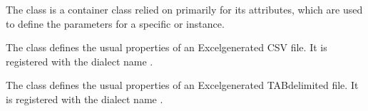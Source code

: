 \documentclass[letterpaper,10pt,english]{sphinxmanual}
\begin{document}
\begin{fulllineitems}
\label{\detokenize{csv:csv.Dialect}}
The {\hyperref[\detokenize{csv:csv.Dialect}]{}} class is a container class relied on primarily for its
attributes, which are used to define the parameters for a specific
{\hyperref[\detokenize{csv:csv.reader}]{}} or {\hyperref[\detokenize{csv:csv.writer}]{}} instance.

\end{fulllineitems}


\vspace{5px}

\begin{fulllineitems}
\label{\detokenize{csv:csv.excel}}
The {\hyperref[\detokenize{csv:csv.excel}]{}} class defines the usual properties of an Excel\sphinxhyphen{}generated CSV
file.  It is registered with the dialect name .

\end{fulllineitems}


\vspace{5px}

\begin{fulllineitems}
\label{\detokenize{csv:csv.excel_tab}}
The {\hyperref[\detokenize{csv:csv.excel_tab}]{}} class defines the usual properties of an Excel\sphinxhyphen{}generated
TAB\sphinxhyphen{}delimited file.  It is registered with the dialect name .

\end{fulllineitems}
\end{document}
